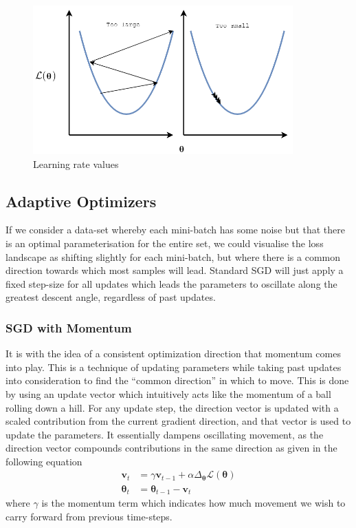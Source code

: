 \documentclass{report}
\begin{document}
	\begin{figure}[h]
		\centering
		\includegraphics[width=10cm]{learningrate}
		\caption{Learning rate values}
		\label{fig:learning-rate:1}
	\end{figure}
	
	\subsection{Adaptive Optimizers} \label{optimizers:1}
	If we consider a data-set whereby each mini-batch has some noise but that there is an optimal parameterisation for the entire set, we could visualise the loss landscape as shifting slightly for each mini-batch, but where there is a common direction towards which most samples will lead. Standard SGD will just apply a fixed step-size for all updates which leads the parameters to oscillate along the greatest descent angle, regardless of past updates. \par
	
	\subsubsection{SGD with Momentum}
	It is with the idea of a consistent optimization direction that momentum \parencite{backprop} comes into play. This is a technique of updating parameters while taking past updates into consideration to find the ``common direction'' in which to move. This is done by using an update vector which intuitively acts like the momentum of a ball rolling down a hill. For any update step, the direction vector is updated with a scaled contribution from the current gradient direction, and that vector is used to update the parameters. It essentially dampens oscillating movement, as the direction vector compounds contributions in the same direction as given in the following equation
	\begin{align}
		\bm{v}_t &= \gamma \bm{v}_{t-1} + \alpha \Delta_{\bm{\theta}} \mathcal{L}(\bm{\theta}) \\
		\bm{\theta}_t &= \bm{\theta}_{t-1} - \bm{v}_t
	\end{align}
	where $\gamma$ is the momentum term which indicates how much movement we wish to carry forward from previous time-steps.
	
\end{document}
